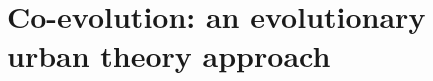 



\chapter[Evolutionary Urban Theory]{Co-evolution: an evolutionary urban theory approach} %

\label{ch:evolutiveurban} %













